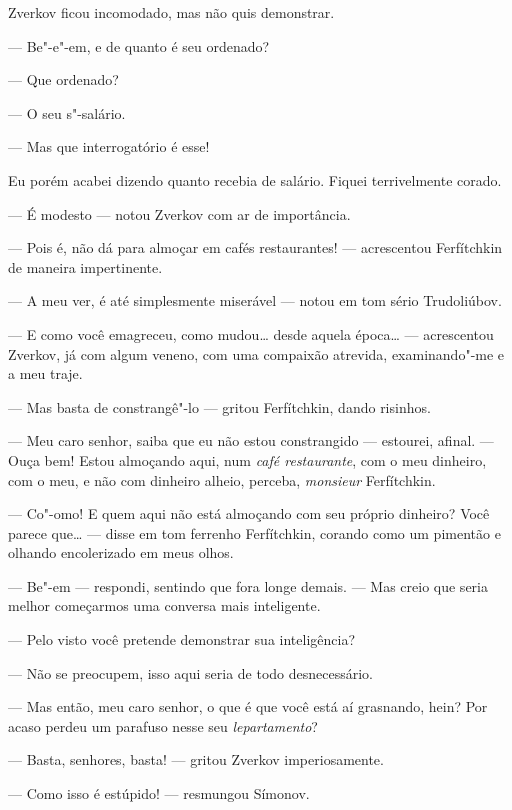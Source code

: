 Zverkov ficou incomodado, mas não quis demonstrar.

--- Be"-e"-em, e de quanto é seu ordenado?

--- Que ordenado?

--- O seu s"-salário.

--- Mas que interrogatório é esse!

Eu porém acabei dizendo quanto recebia de salário. Fiquei terrivelmente
corado.

--- É modesto --- notou Zverkov com ar de importância.

--- Pois é, não dá para almoçar em cafés restaurantes! --- acrescentou
Ferfítchkin de maneira impertinente.

--- A meu ver, é até simplesmente miserável --- notou em tom sério
Trudoliúbov.

--- E como você emagreceu, como mudou\ldots{} desde aquela época\ldots{} ---
acrescentou Zverkov, já com algum veneno, com uma compaixão atrevida,
examinando"-me e a meu traje.

--- Mas basta de constrangê"-lo --- gritou Ferfítchkin, dando risinhos.

--- Meu caro senhor, saiba que eu não estou constrangido --- estourei,
afinal. --- Ouça bem! Estou almoçando aqui, num \textit{café restaurante}, com o
meu dinheiro, com o meu, e não com dinheiro alheio, perceba,
\textit{monsieur} Ferfítchkin.

--- Co"-omo! E quem aqui não está almoçando com seu próprio dinheiro? Você
parece que\ldots{} --- disse em tom ferrenho Ferfítchkin, corando como um
pimentão e olhando encolerizado em meus olhos.

--- Be"-em --- respondi, sentindo que fora longe demais. --- Mas creio que
seria melhor começarmos uma conversa mais inteligente.

--- Pelo visto você pretende demonstrar sua inteligência?

--- Não se preocupem, isso aqui seria de todo desnecessário.

--- Mas então, meu caro senhor, o que é que você está aí grasnando, hein?
Por acaso perdeu um parafuso nesse seu \textit{lepartamento}?

--- Basta, senhores, basta! --- gritou Zverkov imperiosamente.

--- Como isso é estúpido! --- resmungou Símonov.



